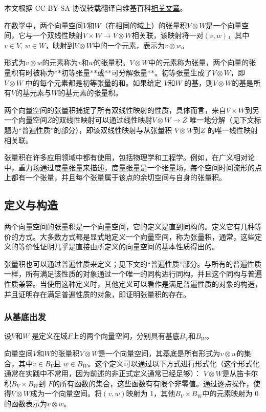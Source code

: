 
本文根据 CC-BY-SA 协议转载翻译自维基百科\href{https://en.wikipedia.org/wiki/Tensor_product}{相关文章}。

在数学中，两个向量空间\( V \)和\( W \)（在相同的域上）的张量积\( V \otimes W \)是一个向量空间，它与一个双线性映射\(V \times W \to V \otimes W\)相关联，该映射将一对\( (v, w) \)，其中\( v \in V\), \( w \in W \)，映射到\( V \otimes W \)中的一个元素，表示为\( v \otimes w \)。

形式为\( v \otimes w \)的元素称为\( v \)和\( w \)的张量积。\( V \otimes W \)中的元素称为张量，两个向量的张量积有时被称为**初等张量**或**可分解张量**。初等张量生成了\( V \otimes W \)，即 \( V \otimes W \) 中的每个元素都是初等张量的和。如果给定 \( V \)和\( W \) 的基，则\( V \otimes W \)的基是所有\( V \)的基元素与\( W \)的基元素的张量积。

两个向量空间的张量积捕捉了所有双线性映射的性质，具体而言，来自\( V \times W \)到另一个向量空间\( Z \)的双线性映射可以通过线性映射\(V \otimes W \to Z\) 唯一地分解（见下文标题为“普遍性质”的部分），即该双线性映射与从张量积 \( V \otimes W \)到\( Z \) 的唯一线性映射相关联。

张量积在许多应用领域中都有使用，包括物理学和工程学。例如，在广义相对论中，重力场通过度量张量来描述，度量张量是一个张量场，每个空间时间流形的点上都有一个张量，并且每个张量属于该点的余切空间与自身的张量积。
\subsection{定义与构造}
两个向量空间的张量积是一个向量空间，它的定义是直到同构的。定义它有几种等价的方式。大多数方式都是显式地定义一个向量空间，称为张量积，通常，这些定义的等价性证明几乎是直接由所定义的向量空间的基本性质得出的。

张量积也可以通过普遍性质来定义；见下文的“普遍性质”部分。与所有的普遍性质一样，所有满足该性质的对象通过一个唯一的同构进行同构，并且这个同构与普遍性质兼容。当使用这种定义时，其他定义可以看作是满足普遍性质的对象的构造，并且证明存在满足普遍性质的对象，即证明张量积的存在。
\subsubsection{从基底出发}
设\( V \)和\( W \) 是定义在域\( F \)上的两个向量空间，分别具有基底\( B_V \)和\( B_W \)。

向量空间\( V \)和\( W \)的张量积\( V \otimes W \)是一个向量空间，其基底是所有形式为\( v \otimes w \)的集合，其中\( v \in B_V \)且 \( w \in B_W \)。这个定义可以通过以下方式进行形式化（这个形式化通常在实践中不常用，因为前述的非正式定义通常已经足够）：  
\( V \otimes W \)是从笛卡尔积\( B_V \times B_W \)到 \( F \)的所有函数的集合，这些函数有有限个非零值。通过逐点操作，使得\( V \otimes W \)成为一个向量空间。将\( (v, w) \)映射为 1，其他\( B_V \times B_W \)中的元素映射为 0 的函数表示为\( v \otimes w \)。

